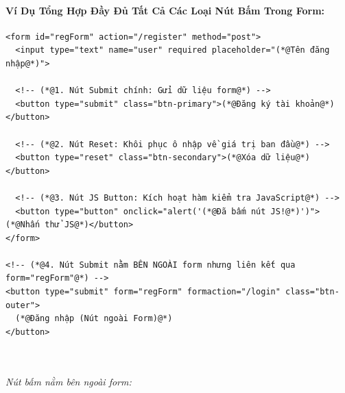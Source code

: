 \documentclass[11pt,oneside]{book}
\begin{document}
\paragraph{Ví Dụ Tổng Hợp Đầy Đủ Tất Cả Các Loại Nút Bấm Trong Form:}

\begin{codeWindow}
\begin{lstlisting}[language=HTML5]
<form id="regForm" action="/register" method="post">
  <input type="text" name="user" required placeholder="(*@Tên đăng nhập@*)">
  
  <!-- (*@1. Nút Submit chính: Gửi dữ liệu form@*) -->
  <button type="submit" class="btn-primary">(*@Đăng ký tài khoản@*)</button>
  
  <!-- (*@2. Nút Reset: Khôi phục ô nhập về giá trị ban đầu@*) -->
  <button type="reset" class="btn-secondary">(*@Xóa dữ liệu@*)</button>
  
  <!-- (*@3. Nút JS Button: Kích hoạt hàm kiểm tra JavaScript@*) -->
  <button type="button" onclick="alert('(*@Đã bấm nút JS!@*)')">(*@Nhấn thử JS@*)</button>
</form>

<!-- (*@4. Nút Submit nằm BÊN NGOÀI form nhưng liên kết qua form="regForm"@*) -->
<button type="submit" form="regForm" formaction="/login" class="btn-outer">
  (*@Đăng nhập (Nút ngoài Form)@*)
</button>
\end{lstlisting}
\end{codeWindow}

\begin{browserWindow}
\sffamily\small
{} \\[6pt]
 \quad
{} \quad
{} \\[6pt]
\textcolor{codeComment}{\small\textit{Nút bấm nằm bên ngoài form:}} \quad
{}
\end{browserWindow}
\end{document}
